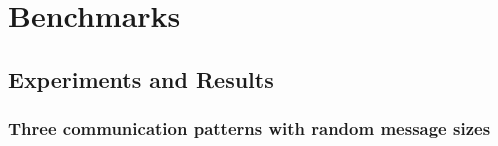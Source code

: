 \section{Benchmarks}
\label{sec:benchmark}





%



\subsection{Experiments and Results}

\subsubsection {Three communication patterns with random message sizes}


%
